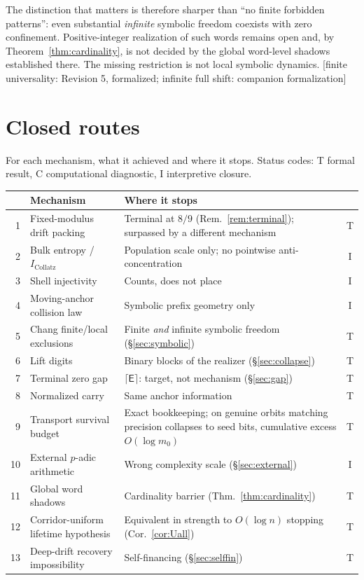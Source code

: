 \documentclass[11pt]{article}
\theoremstyle{plain}
\theoremstyle{definition}
\theoremstyle{remark}
\newcommand{\Edep}{\mathsf{E}}          %
\newcommand{\status}[1]{\textsf{\footnotesize[#1]}}
\begin{document}
The distinction that matters is therefore sharper than ``no finite forbidden patterns'': even
substantial \emph{infinite} symbolic freedom coexists with zero confinement. Positive-integer
realization of such words remains open and, by Theorem~\ref{thm:cardinality}, is not decided by the
global word-level shadows established there. The missing restriction is not local symbolic
dynamics.
\status{finite universality: Revision 5, formalized; infinite full shift: companion formalization}

\section{Closed routes}\label{sec:closed}

For each mechanism, what it achieved and where it stops. Status codes: \textsf{T} formal
result, \textsf{C} computational diagnostic, \textsf{I} interpretive closure.

\begin{center}
\scriptsize
\begin{tabular}{@{}rp{}p{}c@{}}
\toprule
& Mechanism & Where it stops & \\
\midrule
1 & Fixed-modulus drift packing & Terminal at $8/9$ (Rem.~\ref{rem:terminal}); surpassed by a
different mechanism & \textsf{T} \\
2 & Bulk entropy / $I_{\mathrm{Collatz}}$ & Population scale only; no pointwise
anti-concentration & \textsf{I} \\
3 & Shell injectivity & Counts, does not place & \textsf{I} \\
4 & Moving-anchor collision law & Symbolic prefix geometry only & \textsf{I} \\
5 & Chang finite/local exclusions & Finite \emph{and} infinite symbolic freedom
(\S\ref{sec:symbolic}) & \textsf{T} \\
6 & Lift digits & Binary blocks of the realizer (\S\ref{sec:collapse}) & \textsf{T} \\
7 & Terminal zero gap & $\lceil\Edep\rceil$: target, not mechanism (\S\ref{sec:gap}) & \textsf{T} \\
8 & Normalized carry & Same anchor information & \textsf{T} \\
9 & Transport survival budget & Exact bookkeeping; on genuine orbits matching precision collapses
to seed bits, cumulative excess $O(\log m_0)$ & \textsf{T} \\
10 & External $p$-adic arithmetic & Wrong complexity scale (\S\ref{sec:external}) & \textsf{I} \\
11 & Global word shadows & Cardinality barrier (Thm.~\ref{thm:cardinality}) & \textsf{T} \\
12 & Corridor-uniform lifetime hypothesis & Equivalent in strength to $O(\log n)$ stopping
(Cor.~\ref{cor:Uall}) & \textsf{T} \\
13 & Deep-drift recovery impossibility & Self-financing (\S\ref{sec:selffin}) & \textsf{T} \\
\bottomrule
\end{tabular}
\end{center}
\end{document}

